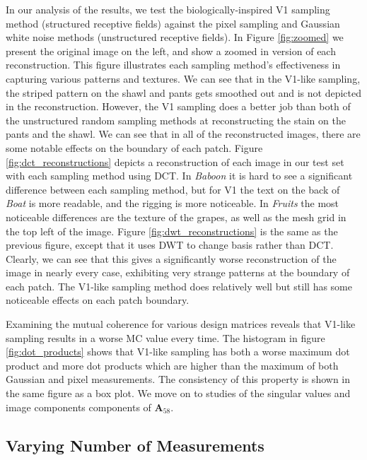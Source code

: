\documentclass{article}
\newcommand{\mat}{\mathbf}
\begin{document}
In our analysis of the results, we test the biologically-inspired V1 sampling method (structured receptive fields) against the pixel sampling and Gaussian white noise methods (unstructured receptive fields).
In Figure \hyperref[fig:zoomed]{\ref{fig:zoomed}} we present the original image on the left, and show a zoomed in version of each reconstruction.
This figure illustrates each sampling method's effectiveness in capturing various patterns and textures.
We can see that in the V1-like sampling, the striped pattern on the shawl and pants gets smoothed out and is not depicted in the reconstruction.
However, the V1 sampling does a better job than both of the unstructured random sampling methods at reconstructing the stain on the pants and the shawl.
We can see that in all of the reconstructed images, there are some notable effects on the boundary of each patch.
Figure \hyperref[fig:dct_Reconstruction's]{\ref{fig:dct_reconstructions}} depicts a reconstruction of each image in our test set with each sampling method using DCT.
In \textit{Baboon} it is hard to see a significant difference between each sampling method, but for V1 the text on the back of \textit{Boat} is more readable, and the rigging is more noticeable.
In \textit{Fruits} the most noticeable differences are the texture of the grapes, as well as the mesh grid in the top left of the image.
Figure \hyperref[fig:dwt_reconstructions]{\ref{fig:dwt_reconstructions}} is the same as the previous figure, except that it uses DWT to change basis rather than DCT.
Clearly, we can see that this gives a significantly worse reconstruction of the image in nearly every case, exhibiting very strange patterns at the boundary of each patch.
The V1-like sampling method  does relatively well but still has some noticeable effects on each patch boundary.

Examining the mutual coherence for various design matrices reveals that V1-like sampling results in a worse MC value  every time. 
The histogram in figure \hyperref[ref:dot_products]{\ref{fig:dot_products}} shows that V1-like sampling has both a worse maximum dot product and more dot products which are higher than the maximum of both Gaussian and pixel measurements. 
The consistency of this property is shown in the same figure as a box plot. 
We move on to studies of the singular values and image components components of $\mat{A}_{58}$.


\subsection{Varying Number of Measurements}
\end{document}

